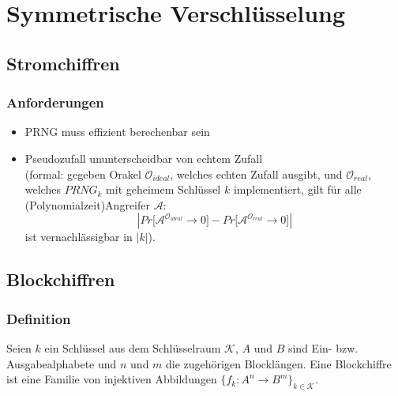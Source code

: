 \documentclass[a4paper,twoside,DIV15,BCOR12mm]{scrbook}
\begin{document}
	
\chapter{Symmetrische Verschlüsselung}


\section{Stromchiffren}

\begin{figure}[htb]

\end{figure}

\subsection{Anforderungen}
	\begin{itemize}
		\item PRNG muss effizient berechenbar sein
		\item Pseudozufall ununterscheidbar von echtem Zufall\\ (formal: gegeben Orakel $\mathcal{O}_{ideal}$, welches echten Zufall ausgibt, und $\mathcal{O}_{real}$, welches ${PRNG}_k$ mit geheimem Schlüssel $k$ implementiert, gilt für alle (Polynomialzeit)Angreifer $\mathcal{A}$: $$\left| Pr\lbrack \mathcal{A}^{\mathcal{O}_{ideal}} \rightarrow 0 \rbrack - Pr\lbrack \mathcal{A}^{\mathcal{O}_{real}} \rightarrow 0 \rbrack \right|$$ ist vernachlässigbar in $\left| k \right|$).
	\end{itemize}
	
\section{Blockchiffren}

\subsection{Definition}

Seien $k$ ein Schlüssel aus dem Schlüsselraum $\mathcal{K}$, $A$ und $B$ sind Ein- bzw. Ausgabealphabete und $n$ und $m$ die zugehörigen Blocklängen. Eine Blockchiffre ist eine Familie von injektiven Abbildungen $\{ f_k \colon A^n \rightarrow B^m \}_{k \in \mathcal{K}}$. \\
\end{document}

